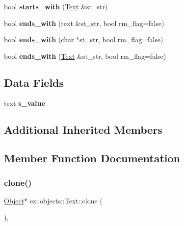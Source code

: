 \begin{DoxyCompactItemize}
\item 
\mbox{\label{classez_1_1objects_1_1Text_adb58d5bf0f151c739a7faf78d2ab235b}} 
bool {\bfseries starts\+\_\+with} (\hyperlink{classez_1_1objects_1_1Text}{Text} \&st\+\_\+str)
\item 
\mbox{\label{classez_1_1objects_1_1Text_a575a146112cd3986d1b135f1443f952b}} 
bool {\bfseries ends\+\_\+with} (text \&st\+\_\+str, bool rm\+\_\+flag=false)
\item 
\mbox{\label{classez_1_1objects_1_1Text_a9f4af2a40999f6741e9e116461344b2a}} 
bool {\bfseries ends\+\_\+with} (char $\ast$st\+\_\+str, bool rm\+\_\+flag=false)
\item 
\mbox{\label{classez_1_1objects_1_1Text_af963815000eb9f1a221560f8e5074780}} 
bool {\bfseries ends\+\_\+with} (\hyperlink{classez_1_1objects_1_1Text}{Text} \&st\+\_\+str, bool rm\+\_\+flag=false)
\end{DoxyCompactItemize}
\subsection*{Data Fields}
\begin{DoxyCompactItemize}
\item 
\mbox{\label{classez_1_1objects_1_1Text_abef37b1520c8d1388bbc48993bd367ab}} 
text {\bfseries s\+\_\+value}
\end{DoxyCompactItemize}
\subsection*{Additional Inherited Members}


\subsection{Member Function Documentation}
\mbox{\label{classez_1_1objects_1_1Text_a800bc02ede66fad6e7f95042012a918e}} 
\subsubsection{\texorpdfstring{clone()}{clone()}}
{\footnotesize\ttfamily \hyperlink{classez_1_1objects_1_1Object}{Object}$\ast$ ez\+::objects\+::\+Text\+::clone (\begin{DoxyParamCaption}{ }\end{DoxyParamCaption})\hspace{0.3cm}{\ttfamily [inline]}, {\ttfamily [virtual]}}


